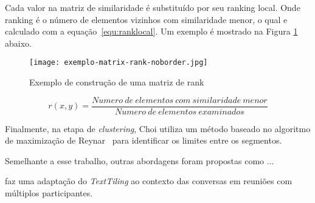 Cada valor na matriz de similaridade é substituído por seu ranking local. Onde ranking é o número de elementos vizinhos com similaridade menor, o qual e calculado com a equação~\ref{equ:ranklocal}. Um exemplo é mostrado na Figura \ref{fig:exemplomatrixrank} abaixo.



  \begin{figure}[!h]

	\centering
	\texttt{[image: exemplo-matrix-rank-noborder.jpg]}
	\caption{Exemplo de construção de uma matriz de rank}
	\label{fig:exemplomatrixrank}

  \end{figure}




\begin{equation}
r(x,y) = \frac
{Numero\ de\ elementos\ com\ similaridade\ menor}
{Numero\ de\ elementos\ examinados}
\label{equ:ranklocal}
\end{equation}


	
	Finalmente, na etapa de \textit{clustering}, Choi utiliza um método baseado no algoritmo de maximização de Reynar~\cite{reynar} para identificar os limites entre os segmentos.




Semelhante a esse trabalho, outras abordagens foram propostas como ...

\cite{Banerjee200657} faz uma adaptação do \textit{TextTiling} ao contexto das conversas em reuniões com múltiplos participantes.  


